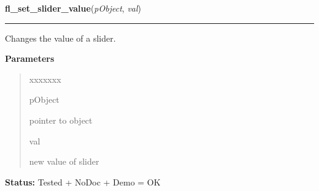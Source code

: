     \label{xformslib:library:fl_set_slider_value}

    \vspace{0.5ex}

\hspace{.8\funcindent}\begin{boxedminipage}{\funcwidth}

    \raggedright \textbf{fl\_set\_slider\_value}(\textit{pObject}, \textit{val})

    \vspace{-1.5ex}

    \rule{\textwidth}{0.5\fboxrule}
\setlength{\parskip}{2ex}
    Changes the value of a slider.

\setlength{\parskip}{1ex}
      \textbf{Parameters}
      \vspace{-1ex}

      \begin{quote}
        \begin{Ventry}{xxxxxxx}

          \item[pObject]

          pointer to object

          \item[val]

          new value of slider

        \end{Ventry}

      \end{quote}

\textbf{Status:} Tested + NoDoc + Demo = OK



    \end{boxedminipage}

    \label{xformslib:library:fl_get_slider_value}

    \vspace{0.5ex}

